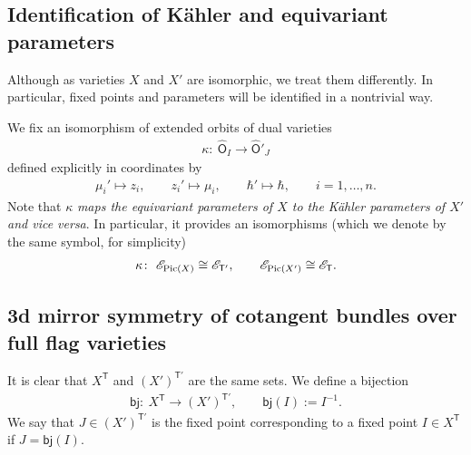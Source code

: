 \documentclass[10pt,a4paper]{amsart}
\newcommand{\bT}{\mathsf{T}}
\newcommand{\Or}{\textsf{O}}
\newcommand{\cE}{\mathscr{E}}
\numberwithin{equation}{section}
\begin{document}
 \subsection{Identification of K\"ahler and equivariant parameters}

 Although as varieties $X$ and $X'$ are isomorphic, we treat them differently. In particular, fixed points and parameters will be identified in a nontrivial way.

 We fix an isomorphism of extended orbits of dual varieties
 \begin{gather*}
 \kappa \colon \ \widehat{\Or}_{I} \rightarrow \widehat{\Or}'_{J}
 \end{gather*}
 defined explicitly in coordinates by
 \begin{gather*}
 \mu_{i}' \mapsto z_{i}, \qquad z_{i}' \mapsto \mu_{i}, \qquad \hbar' \mapsto \hbar , \qquad i=1,\dots, n.
 \end{gather*}
 Note that $\kappa$ {\it maps the equivariant parameters of $X$ to the K\"ahler parameters of $X'$ and vice versa}. In particular, it provides an isomorphisms (which we denote by the same symbol, for simplicity)
 \begin{gather} \label{ident}
 \kappa\colon \ \cE_{{\rm Pic}(X)}\cong \cE_{\bT'}, \qquad \cE_{{\rm Pic}(X')}\cong \cE_{\bT}.
 \end{gather}

\subsection{3d mirror symmetry of cotangent bundles over full flag varieties}
 It is clear that $X^{\bT}$ and $(X')^{\bT'}$ are the same sets. We define a bijection
 \begin{gather*}
 \textsf{bj}\colon \ X^{\bT} \rightarrow (X')^{\bT'}, \qquad \textsf{bj}(I) := I^{-1}.
 \end{gather*}
 We say that $J \in (X')^{\bT'}$ is the fixed point corresponding to a fixed point $I\in X^{\bT}$ if $J=\textsf{bj}(I)$.
\end{document}
